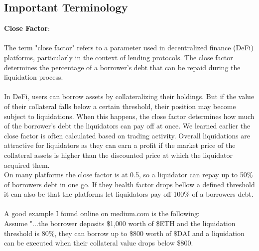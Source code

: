 \documentclass{article}
\begin{document}
\subsection{Important Terminology}
\textbf{Close Factor}:\\\\
The term "close factor" refers to a parameter used in decentralized finance (DeFi) platforms, particularly in the context of lending protocols. The close factor determines the percentage of a borrower's debt that can be repaid during the liquidation process.\\\\In DeFi, users can borrow assets by collateralizing their holdings. But if the value of their collateral falls below a certain threshold, their position may become subject to liquidations. When this happens, the close factor determines how much of the borrower's debt the liquidators can pay off at once. We learned earlier the close factor is often calculated based on trading activity. Overall liquidations are attractive for liquidators as they can earn a profit if the market price of the collateral assets is higher than the discounted price at which the liquidator acquired them.\\ On many platforms the close factor is at 0.5, so a liquidator can repay up to 50\% of borrowers debt in one go. If they health factor drops bellow a defined threshold it can also be that the platforms let liquidators pay off 100\% of a borrowers debt.\\\\A good example I found online on medium.com is the following:\\
Assume "...the borrower deposits \$1,000 worth of \$ETH and the liquidation threshold is 80\%, they can borrow up to \$800 worth of \$DAI and a liquidation can be executed when their collateral value drops below \$800.
\end{document}

